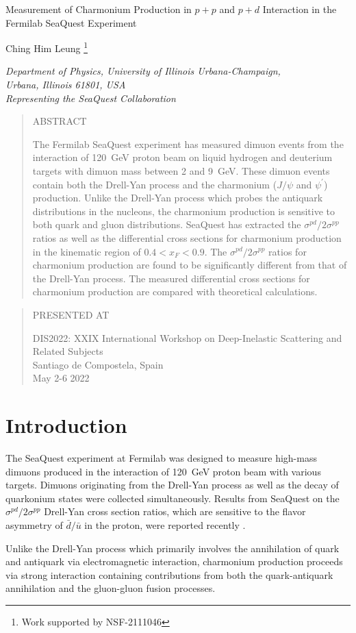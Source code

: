 \documentclass[10pt, a4paper,final]{article}
\def\Title#1{\begin{center} {\Large #1 } \end{center}}
\def\Author#1{\begin{center}{ \sc #1} \end{center}}
\def\Address#1{\begin{center}{ \it #1} \end{center}}
\newcommand\pubblock{\rightline{\begin{tabular}{l} Proceedings of DIS2022\\ 
         \pubdate  \end{tabular}}}
\newenvironment{Abstract}{\begin{quotation} \begin{center} 
             \large ABSTRACT \end{center}\bigskip 
      \begin{large}}{\end{large}\end{quotation}}
\newenvironment{Presented}{\begin{quotation} \begin{center} 
             PRESENTED AT\end{center}\bigskip 
      \begin{center}\begin{large}}{\end{large}\end{center} \end{quotation}}
\newcommand\pubdate{\today}
\def\affiliation{
Department of Physics, University of Illinois Urbana-Champaign, \\Urbana, Illinois 61801, USA\\
Representing the SeaQuest Collaboration}
\def\support{\footnote{Work supported by NSF-2111046}}
\newcommand{\conference}{DIS2022: XXIX International Workshop on Deep-Inelastic Scattering and Related Subjects\\
Santiago de Compostela, Spain\\
May 2-6 2022}
\begin{document}
\large
\begin{titlepage}
	\pubblock


	\vfill
	\Title{Measurement of Charmonium Production in $p + p$ and $p + d$ Interaction in the Fermilab SeaQuest Experiment}
	\vfill

	\Author{Ching Him Leung \support}
	\Address{\affiliation}
	\vfill

	\begin{Abstract}
		The Fermilab SeaQuest experiment has measured dimuon events from the interaction
		of \SI{120}{\GeV} proton beam on liquid hydrogen and deuterium targets with dimuon
		mass between \num{2} and \SI{9}{\GeV}. These dimuon events contain both the Drell-Yan
		process and the charmonium ($J/\psi$ and $\psi^\prime$) production. Unlike the Drell-Yan process
		which probes the antiquark distributions in the nucleons, the charmonium production
		is sensitive to both quark and gluon distributions. SeaQuest has extracted the
		$\sigma^{pd}/2\sigma^{pp}$ ratios as well as the differential cross sections for
		charmonium production in the kinematic region of $0.4 < x_F < 0.9$. The $\sigma^{pd}/2\sigma^{pp}$
		ratios for charmonium production are found to be significantly different
		from that of the Drell-Yan process. The measured differential cross sections for
		charmonium production are compared with theoretical calculations.
	\end{Abstract}

	\vfill

	\begin{Presented}
		\conference
	\end{Presented}
	\vfill
\end{titlepage}

\setcounter{footnote}{0}
\normalsize


\section{Introduction}
\label{sec:intro}
The SeaQuest experiment at Fermilab was designed to measure high-mass dimuons
produced in the interaction of \SI{120}{\GeV} proton beam with various targets.
Dimuons originating from the Drell-Yan process \cite{drell1970} as well as the
decay of quarkonium states were collected simultaneously. Results from SeaQuest
on the $\sigma^{pd}/2\sigma^{pp}$ Drell-Yan cross section ratios, which are sensitive to
the flavor asymmetry of $\bar{d}/\bar{u}$ in the proton, were reported recently
\cite{dove2021}.

Unlike the Drell-Yan process which primarily involves the annihilation of quark
and antiquark via electromagnetic interaction, charmonium production proceeds
via strong interaction containing contributions from both the quark-antiquark
annihilation and the gluon-gluon fusion processes.
\end{document}

